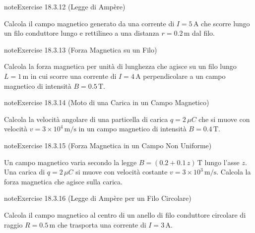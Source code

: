 \documentclass[letterpaper,10pt,italian]{jupyterBook}
\begin{document}
\begin{sphinxadmonition}{note}{Exercise 18.3.12 (Legge di Ampère)}



\sphinxAtStartPar
Calcola il campo magnetico generato da una corrente di \(I = 5 \, \text{A}\) che scorre lungo un filo conduttore lungo e rettilineo a una distanza \(r = 0.2 \, \text{m}\) dal filo.
\end{sphinxadmonition}
 \label{exercise:ch/electromagnetism/electromagnetism-steady-problems-exercise-12}

\begin{sphinxadmonition}{note}{Exercise 18.3.13 (Forza Magnetica su un Filo)}



\sphinxAtStartPar
Calcola la forza magnetica per unità di lunghezza che agisce su un filo lungo \(L = 1 \, \text{m}\) in cui scorre una corrente di \(I = 4 \, \text{A}\) perpendicolare a un campo magnetico di intensità \(B = 0.5 \, \text{T}\).
\end{sphinxadmonition}
 \label{exercise:ch/electromagnetism/electromagnetism-steady-problems-exercise-13}

\begin{sphinxadmonition}{note}{Exercise 18.3.14 (Moto di una Carica in un Campo Magnetico)}



\sphinxAtStartPar
Calcola la velocità angolare di una particella di carica \(q = 2 \, \mu C\) che si muove con velocità \(v = 3 \times 10^4 \, \text{m/s}\) in un campo magnetico di intensità \(B = 0.4 \, \text{T}\).
\end{sphinxadmonition}
 \label{exercise:ch/electromagnetism/electromagnetism-steady-problems-exercise-14}

\begin{sphinxadmonition}{note}{Exercise 18.3.15 (Forza Magnetica in un Campo Non Uniforme)}



\sphinxAtStartPar
Un campo magnetico varia secondo la legge \(B = (0.2 + 0.1 \, z) \, \text{T}\) lungo l’asse \(z\). Una carica di \(q = 2 \, \mu C\) si muove con velocità costante \(v = 3 \times 10^3 \, \text{m/s}\). Calcola la forza magnetica che agisce sulla carica.
\end{sphinxadmonition}
 \label{exercise:ch/electromagnetism/electromagnetism-steady-problems-exercise-15}

\begin{sphinxadmonition}{note}{Exercise 18.3.16 (Legge di Ampère per un Filo Circolare)}



\sphinxAtStartPar
Calcola il campo magnetico al centro di un anello di filo conduttore circolare di raggio \(R = 0.5 \, \text{m}\) che trasporta una corrente di \(I = 3 \, \text{A}\).
\end{sphinxadmonition}
 \label{exercise:ch/electromagnetism/electromagnetism-steady-problems-exercise-16}
\end{document}
